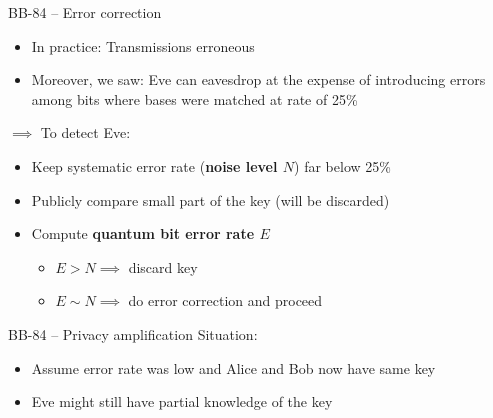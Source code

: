 \documentclass{beamer}
\begin{document}
	\begin{frame}{BB-84 – Error correction}
		\begin{itemize}
			\item In practice: Transmissions erroneous
			\item Moreover, we saw: Eve can eavesdrop at the expense of
			introducing errors among bits where bases were matched at
			rate of 25\%
		\end{itemize}
		$\implies$ To detect Eve:
		\begin{itemize}
			\item Keep systematic error rate (\textbf{noise level $N$})
			far below 25\%
			\item Publicly compare small part of the key (will be discarded)
			\item Compute \textbf{quantum bit error rate $E$}
			\begin{itemize}
				\item $E > N \implies$ discard key
				\item $E \sim N \implies$ do error correction and proceed
			\end{itemize}
		\end{itemize}
	\end{frame}

	\begin{frame}{BB-84 – Privacy amplification}
		Situation:
		\begin{itemize}
			\item Assume error rate was low and Alice and Bob now have
			same key
			\item Eve might still have partial knowledge of the key
		\end{itemize}

	\end{frame}
\end{document}
